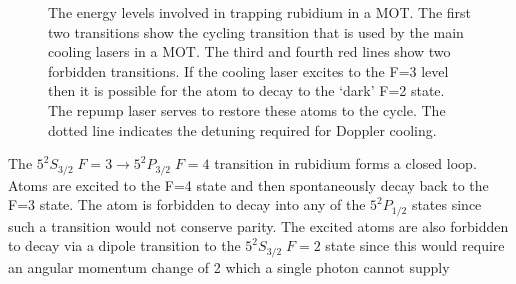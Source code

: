 \begin{figure}[h]
\centering
\caption[Title]{The energy levels involved in trapping rubidium in a MOT. The first two transitions show the cycling transition that is used by the main cooling lasers in a MOT. The third and fourth red lines show two forbidden transitions. If the cooling laser excites to the F=3 level then it is possible for the atom to decay to the `dark' F=2 state. The repump laser serves to restore these atoms to the cycle. The dotted line indicates the detuning required for Doppler cooling.}
\label{fig:energy_levels}
\end{figure}

The $5 ^2 S_{3/2}\;F=3\rightarrow5 ^2 P_{3/2}\;F=4$ transition in rubidium forms a closed loop. Atoms are excited to the F=4 state and then spontaneously decay back to the F=3 state. The atom is forbidden to decay into any of the $5 ^2 P_{1/2}$ states since such a transition would not conserve parity. The excited atoms are also forbidden to decay via a dipole transition to the $5 ^2 S_{3/2}\;F=2$ state since this would require an angular momentum change of 2 which a single photon cannot supply

